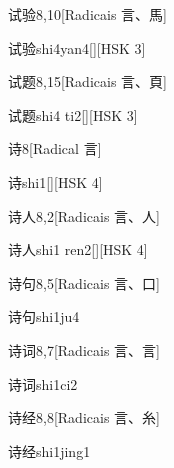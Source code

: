 \begin{entry}{试验}{8,10}[Radicais ⾔、⾺]
  \begin{phonetics}{试验}{shi4yan4}[][HSK 3]
  \end{phonetics}
\end{entry}

\begin{entry}{试题}{8,15}[Radicais ⾔、⾴]
  \begin{phonetics}{试题}{shi4 ti2}[][HSK 3]
  \end{phonetics}
\end{entry}

\begin{entry}{诗}{8}[Radical ⾔]
  \begin{phonetics}{诗}{shi1}[][HSK 4]
  \end{phonetics}
\end{entry}

\begin{entry}{诗人}{8,2}[Radicais ⾔、⼈]
  \begin{phonetics}{诗人}{shi1 ren2}[][HSK 4]
  \end{phonetics}
\end{entry}

\begin{entry}{诗句}{8,5}[Radicais ⾔、⼝]
  \begin{phonetics}{诗句}{shi1ju4}
  \end{phonetics}
\end{entry}

\begin{entry}{诗词}{8,7}[Radicais ⾔、⾔]
  \begin{phonetics}{诗词}{shi1ci2}
  \end{phonetics}
\end{entry}

\begin{entry}{诗经}{8,8}[Radicais ⾔、⽷]
  \begin{phonetics}{诗经}{shi1jing1}
  \end{phonetics}
\end{entry}

